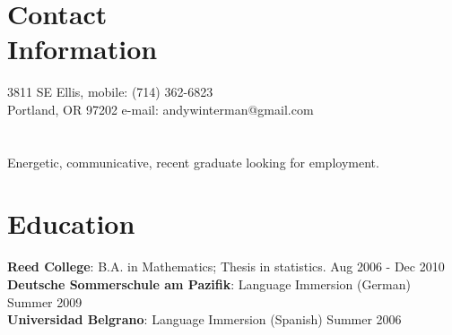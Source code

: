 \documentclass[margin,line]{resume}
\begin{document}
\begin{resume}

    \section{\mysidestyle Contact\\Information}


    3811 SE Ellis,                           \hfill  mobile: (714) 362-6823          \vspace{0mm}\\\vspace{0mm}%
    Portland, OR 97202                         \hfill     e-mail: andywinterman@gmail.com      \vspace{0mm}\\%
  \vspace{-4.5mm}%

 \section{} Energetic, communicative, recent graduate looking for employment.%
    \section{\mysidestyle Education}

\textbf{Reed College}: B.A. in Mathematics; Thesis in statistics.
 \vspace{1mm} \hfill Aug 2006 - Dec 2010 \vspace{1mm}\\
\textbf{Deutsche Sommerschule am Pazifik}:  Language Immersion (German) \vspace{1mm} \hfill Summer 2009
\vspace{1mm} \\
\textbf{Universidad Belgrano}: Language Immersion (Spanish) \vspace{1mm} \hfill Summer 2006 \vspace{1mm}


\end{resume}
\end{document}
